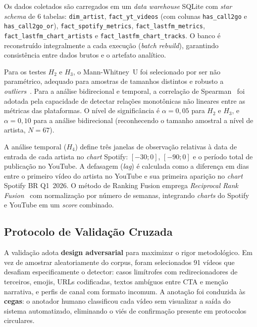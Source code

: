 ﻿\documentclass[12pt]{article}
\begin{document}
Os dados coletados são carregados em um \textit{data warehouse} SQLite com
\textit{star schema} de 6 tabelas: \texttt{dim\_artist},
\texttt{fact\_yt\_videos} (com colunas \texttt{has\_call2go} e
\texttt{has\_call2go\_or}), \texttt{fact\_spotify\_metrics},
\texttt{fact\_lastfm\_metrics}, \texttt{fact\_lastfm\_chart\_artists} e
\texttt{fact\_lastfm\_chart\_tracks}. O banco é reconstruído integralmente a
cada execução (\textit{batch rebuild}), garantindo consistência entre dados
brutos e o artefato analítico.

Para os testes $H_2$ e $H_3$, o Mann-Whitney~U foi selecionado por ser não
paramétrico, adequado para amostras de tamanhos distintos e robusto a
\textit{outliers}~\cite{mann1947}. Para a análise bidirecional e temporal, a
correlação de Spearman~\cite{spearman1904} foi adotada pela capacidade de
detectar relações monotônicas não lineares entre as métricas das plataformas.
O nível de significância é $\alpha = 0{,}05$ para $H_2$ e $H_3$, e
$\alpha = 0{,}10$ para a análise bidirecional (reconhecendo o tamanho amostral
a nível de artista, $N = 67$).

A análise temporal ($H_4$) define três janelas de observação relativas à
data de entrada de cada artista no \textit{chart} Spotify: $[-30; 0]$,
$[-90; 0]$ e o período total de publicação no YouTube. A defasagem
(\textit{lag}) é calculada como a diferença em dias entre o primeiro vídeo do
artista no YouTube e sua primeira aparição no \textit{chart} Spotify BR
Q1~2026. O método de Ranking Fusion emprega \textit{Reciprocal Rank
Fusion}~\cite{cormack2009} com normalização por número de semanas, integrando
\textit{charts} do Spotify e YouTube em um \textit{score} combinado.

\subsection{Protocolo de Validação Cruzada}

A validação adota \textbf{design adversarial} para maximizar o rigor
metodológico. Em vez de amostrar aleatoriamente do corpus, foram
selecionados 91 vídeos que desafiam especificamente o detector: casos
limítrofes com redirecionadores de terceiros, emojis, URLs codificadas,
textos ambíguos entre CTA e menção narrativa, e perfis de canal com formato
incomum. A anotação foi conduzida às \textbf{cegas}: o anotador humano
classificou cada vídeo sem visualizar a saída do sistema automatizado,
eliminando o viés de confirmação presente em protocolos circulares.
\end{document}
